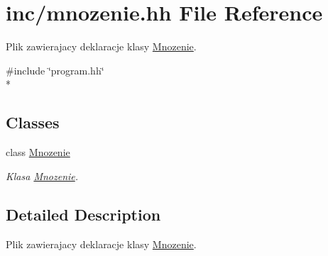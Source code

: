 \hypertarget{mnozenie_8hh}{\section{inc/mnozenie.hh File Reference}
\label{mnozenie_8hh}
}


Plik zawierajacy deklaracje klasy \hyperlink{class_mnozenie}{Mnozenie}.  


{\ttfamily \#include \char`\"{}program.\-hh\char`\"{}}\\*
\subsection*{Classes}
\begin{DoxyCompactItemize}
\item 
class \hyperlink{class_mnozenie}{Mnozenie}
\begin{DoxyCompactList}\small\item\em Klasa \hyperlink{class_mnozenie}{Mnozenie}. \end{DoxyCompactList}\end{DoxyCompactItemize}


\subsection{Detailed Description}
Plik zawierajacy deklaracje klasy \hyperlink{class_mnozenie}{Mnozenie}. 
